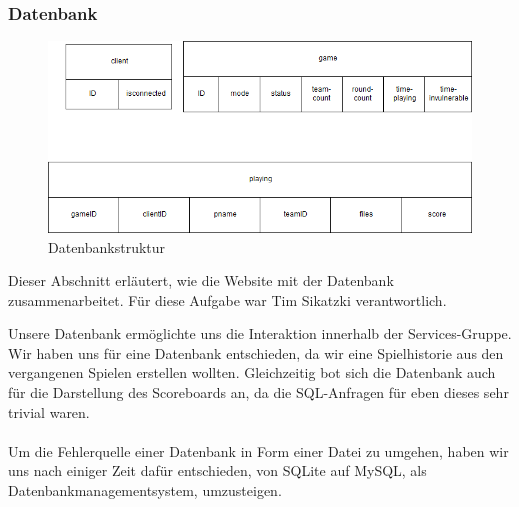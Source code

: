 \subsubsection{Datenbank}
\label{sec:services-datenbank}
\begin{figure}[htb]
	\begin{center}
		\includegraphics[width=0.8 \textwidth]{Databasestrucb.png}
		\caption{Datenbankstruktur}
		\label{fig:database}
	\end{center}
\end{figure}
Dieser Abschnitt erläutert, wie die Website mit der Datenbank zusammenarbeitet. Für diese Aufgabe war Tim Sikatzki verantwortlich.

Unsere Datenbank ermöglichte uns die Interaktion innerhalb der Services-Gruppe. Wir haben uns für eine Datenbank entschieden, da wir eine Spielhistorie aus den vergangenen Spielen erstellen wollten. Gleichzeitig bot sich die Datenbank auch für die Darstellung des Scoreboards an, da die SQL-Anfragen für eben dieses sehr trivial waren.\\\\
Um die Fehlerquelle einer Datenbank in Form einer Datei zu umgehen, haben wir uns nach einiger Zeit dafür entschieden, von SQLite auf MySQL, als Datenbankmanagementsystem, umzusteigen.\\\\

